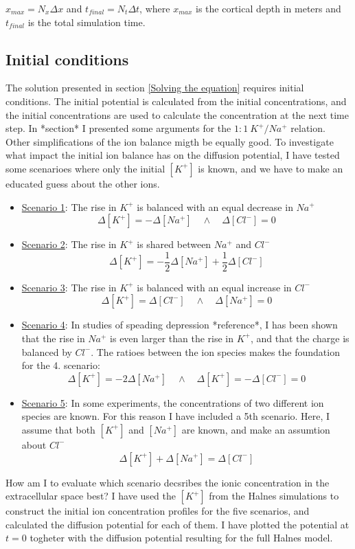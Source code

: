 \documentclass{article}
\begin{document}
$x_{max} =N_x \Delta x$ and $t_{final} = N_t \Delta t$, where $x_{max}$ is the cortical depth in meters and $t_{final}$ is the total simulation time.
\subsection{Initial conditions}\label{Initial conditions: Ion concentration profiles from experiments}
The solution presented in section \ref{Solving the equation} requires initial conditions. The initial potential is calculated from the initial concentrations, and the initial concentrations are used to calculate the concentration at the next time step. In *section* I presented some arguments for the $1\!:\!1\ K^+\!/Na^+$ relation. Other simplifications of the ion balance migth be equally good. To investigate what impact the initial ion balance has on the diffusion potential, I have tested some scenarioes where only the initial $[K^+]$ is known, and we have to make an educated guess about the other ions.
\begin{itemize}
	\item[]\underline{Scenario 1}: The rise in $K^+$ is balanced with an equal decrease in $Na^+$
	  $$\Delta [K^+] = -\Delta [Na^+] \quad \land \quad \Delta [Cl^-] =0$$
	\item[]\underline{Scenario 2}:  The rise in $K^+$ is shared between $Na^+$ and $Cl^-$
	$$\Delta [K^+] = -\frac{1}{2} \Delta [Na^+] +\frac{1}{2} \Delta [Cl^-] $$ 
		\item[]\underline{Scenario 3}:  The rise in $K^+$ is balanced with an equal increase in $Cl^-$
	  $$\Delta [K^+] = \Delta [Cl^-] \quad \land \quad \Delta [Na^+] =0$$
	  \item[]\underline{Scenario 4}:  In studies of speading depression *reference*, I has been shown that the rise in $Na^+$ is even larger than the rise in $K^+$, and that the charge is balanced by $Cl^-$. The ratioes between the ion species makes the foundation for the 4. scenario:
	$$\Delta [K^+] = -2 \Delta [Na^+] \quad \land \quad \Delta [K^+] =  -\Delta [Cl^-] =0$$ 
	\item[]\underline{Scenario 5}: In some experiments, the concentrations of two different ion species are known. For this reason I have included a 5th scenario. Here, I assume that both $[K^+]$ and $[Na^+]$ are known, and make an assumtion about $Cl^-$
	$$\Delta [K^+] + \Delta [Na^+] = \Delta[Cl^-] $$
\end{itemize}

How am I to evaluate which scenario decsribes the ionic concentration in the extracellular space best? I have used the $[K^+]$ from the Halnes simulations to construct the initial ion concentration profiles for the five scenarios, and calculated the diffusion potential for each of them. I have plotted the potential at $t=0$ togheter with the diffusion potential resulting for the full Halnes model. 
\end{document}
